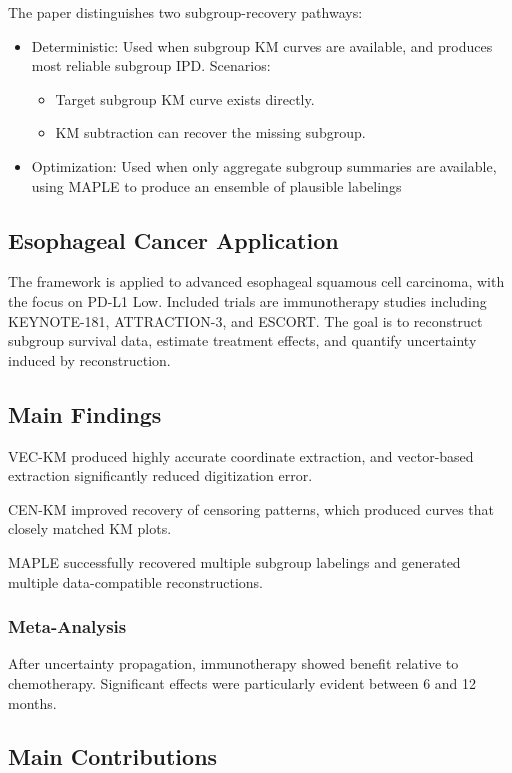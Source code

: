 \documentclass[11pt]{article}
\begin{document}
The paper distinguishes two subgroup-recovery pathways:
\begin{itemize}
    \item Deterministic: Used when subgroup KM curves are available, and produces most reliable subgroup IPD. Scenarios:
    \begin{itemize}
        \item Target subgroup KM curve exists directly.
        \item KM subtraction can recover the missing subgroup.
    \end{itemize}
    \item Optimization: Used when only aggregate subgroup summaries are available, using MAPLE to produce an ensemble of plausible labelings
\end{itemize}

\subsection*{Esophageal Cancer Application}

The framework is applied to advanced esophageal squamous cell carcinoma, with the focus on PD-L1 Low. Included trials are immunotherapy studies including KEYNOTE-181, ATTRACTION-3, and ESCORT.
The goal is to reconstruct subgroup survival data, estimate treatment effects, and quantify uncertainty induced by reconstruction.

\subsection*{Main Findings}
VEC-KM produced highly accurate coordinate extraction, and vector-based extraction significantly reduced digitization error.

CEN-KM improved recovery of censoring patterns, which produced curves that closely matched KM plots.

MAPLE successfully recovered multiple subgroup labelings and generated multiple data-compatible reconstructions.


\subsubsection*{Meta-Analysis}

After uncertainty propagation, immunotherapy showed benefit relative to chemotherapy. Significant effects were particularly evident between 6 and 12 months.

\subsection*{Main Contributions}
\end{document}
